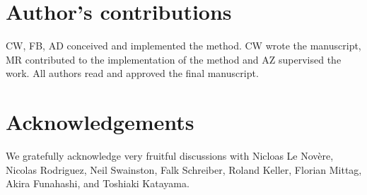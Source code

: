 \documentclass[10pt]{bmc_article}
\newenvironment{bmcformat}{\baselineskip20pt\sloppy\setboolean{publ}{false}}{\baselineskip20pt\sloppy}
\begin{document}
\begin{bmcformat}
\section*{Author's contributions}
CW, FB, AD conceived and implemented the method. CW wrote the manuscript, MR contributed to the implementation of the method and AZ supervised the work. All authors read and approved the final manuscript.

\section*{Acknowledgements}
We gratefully acknowledge very fruitful discussions with Nicloas Le Nov\`{e}re, Nicolas Rodriguez, Neil Swainston, Falk Schreiber, Roland Keller, Florian Mittag, Akira Funahashi, and Toshiaki Katayama.



\newpage
{
   }     %





\end{bmcformat}
\end{document}
